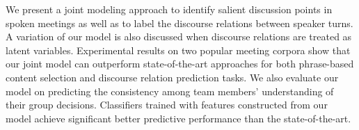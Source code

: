 We present a joint modeling approach to identify salient discussion points in spoken meetings as well as to label the discourse relations between speaker turns. A variation of our model is also discussed when discourse relations are treated as latent variables. Experimental results on two popular meeting corpora show that our joint model can outperform state-of-the-art approaches for both phrase-based content selection and discourse relation prediction tasks. We also evaluate our model on predicting the consistency among team members' understanding of their group decisions. Classifiers trained with features constructed from our model achieve significant better predictive performance than the state-of-the-art.
